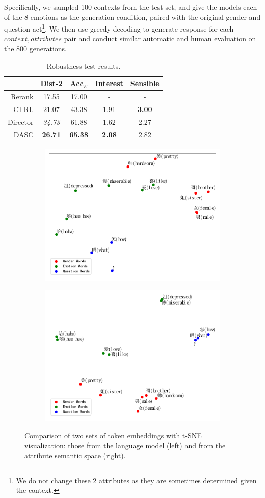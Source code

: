 Specifically, we sampled 100 contexts from the test set, and give the models each of the 8 emotions as the generation condition, paired with the original gender and question act\footnote{We do not change these 2 attributes as they are sometimes determined given the context.}. We then use greedy decoding to generate response for each \(context, attributes\) pair and conduct similar automatic and human evaluation on the 800 generations. 

\begin{table}[th]
    \small
    \centering
    \begin{tabular}{rcccc}
    \hline
             & Dist-2         & Acc$_E$            & Interest      & Sensible      \\ \hline
    Rerank   & 17.55          & 17.00          & -             & -             \\
    CTRL     & 21.07          & 43.38          & 1.91          & \textbf{3.00} \\
    Director & \textit{34.73} & 61.88          & 1.62          & 2.27             \\
    DASC     & \textbf{26.71} & \textbf{65.38} & \textbf{2.08} & 2.82 \\ \hline
    \end{tabular}
    \caption{Robustness test results.}
    \label{tab:robustness}
\end{table}

\begin{figure}[t]
    \centering
    \begin{subfigure}{}
        \centering
        \includegraphics[width=.48\linewidth]{figures/tsne_sub_plot_token_emb2.pdf}  
    \end{subfigure}
    \begin{subfigure}{}
        \centering
        \includegraphics[width=.48\linewidth]{figures/tsne_sub_plot2.pdf}  
    \end{subfigure}
    \caption{Comparison of two sets of token embeddings with t-SNE visualization: those from the language model (left) and from the attribute semantic space (right).}
    \label{fig:token_emb}
\end{figure}

